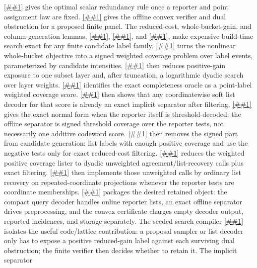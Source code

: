 \documentclass[10pt]{article}
\newcommand{\cref}[1]{\ref{##1}}
\newcommand{\Cref}[1]{\ref{##1}}
\theoremstyle{definition}
\begin{document}
\cref{lem:scalar-redundancy-waterfill} gives the optimal scalar redundancy
rule once a reporter and point assignment law are fixed.
\cref{lem:finite-rate-coverage-convex} gives the offline convex verifier and
dual obstruction for a proposed finite panel.  The reduced-cost,
whole-bucket-gain, and column-generation lemmas,
\cref{lem:rate-coverage-column-gain}, \cref{cor:whole-bucket-reduced-gain}, and
\cref{lem:finite-rate-coverage-column-generation}, make expensive build-time
search exact for any finite candidate label family.
\Cref{lem:reduced-gain-variational-separation} turns the nonlinear
whole-bucket objective into a signed weighted coverage problem over label
events, parameterized by candidate intensities.
\Cref{lem:layer-cake-reduced-gain-separation} then reduces positive-gain
exposure to one subset layer and, after truncation, a logarithmic dyadic search
over layer weights.  \Cref{cor:pointwise-reduced-cost-separation} identifies
the exact completeness oracle as a point-label weighted coverage score.
\Cref{cor:soft-list-decoding-reduced-cost-separator} then shows that any
coordinatewise soft list decoder for that score is already an exact implicit
separator after filtering.
\Cref{cor:threshold-event-reduced-cost} gives the exact normal form when the
reporter itself is threshold-decoded: the offline separator is signed
threshold coverage over the reporter tests, not necessarily one additive
codeword score.
\Cref{cor:positive-coverage-screen} then removes the signed part from
candidate generation: list labels with enough positive coverage and use the
negative tests only for exact reduced-cost filtering.
\Cref{cor:dyadic-positive-list-recovery} reduces the weighted positive
coverage lister to dyadic unweighted agreement/list-recovery calls plus exact
filtering.
\Cref{cor:ordinary-list-recovery-positive-coverage} then implements those
unweighted calls by ordinary list recovery on repeated-coordinate projections
whenever the reporter tests are coordinate memberships.
\Cref{cor:unified-soft-decoded-rate-coverage} packages the desired retained
object: the compact query decoder handles online reporter lists, an exact
offline separator drives preprocessing, and the convex certificate charges
empty decoder output, reported incidences, and storage separately.  The
seeded search
compiler \cref{lem:seeded-reduced-gain-search} isolates the useful
code/lattice contribution: a proposal sampler or list decoder only has to
expose a positive reduced-gain label against each surviving dual obstruction;
the finite verifier then decides whether to retain it.  The implicit separator
\end{document}
